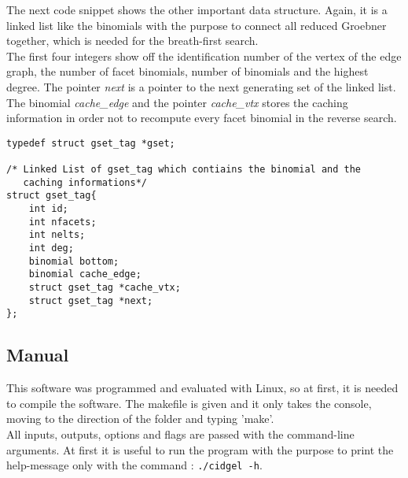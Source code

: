 The next code snippet shows the other important data structure. Again, it is a linked list like the binomials with the purpose to connect all reduced Groebner together, which is needed for the breath-first search.\\

The first four integers show off the identification number of the vertex of the edge graph, the number of facet binomials, number of binomials and the highest degree. The pointer \emph{next} is a pointer to the next generating set of the linked list. The binomial \emph{cache\_edge} and the pointer \emph{cache\_vtx} stores the caching information in order not to recompute every facet binomial in the reverse search. 

\begin{lstlisting} 
typedef struct gset_tag *gset;

/* Linked List of gset_tag which contiains the binomial and the
   caching informations*/
struct gset_tag{
    int id;
    int nfacets;
    int nelts;
    int deg;
    binomial bottom;
    binomial cache_edge;
    struct gset_tag *cache_vtx;
    struct gset_tag *next;
};

\end{lstlisting}

 
 


\subsection{Manual}
\label{subsec:manual}
This software was programmed and evaluated with Linux, so at first, it is needed to compile the software. The makefile is given and it only takes the console, moving to the direction of the folder and typing 'make'. \\
All inputs, outputs, options and flags are passed with the command-line arguments. At first it is useful to run the program with the purpose to print the help-message only with the command : 
\texttt{./cidgel -h}.

